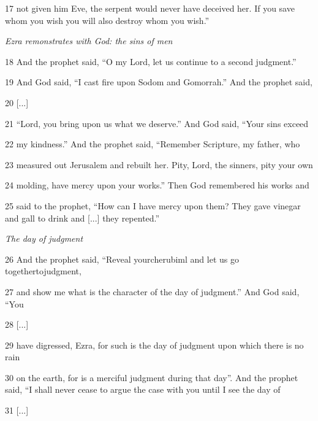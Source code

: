 \par 17 not given him Eve, the serpent would never have deceived her. If you save whom you wish you will also destroy whom you wish.”

\par \textit{Ezra remonstrates with God: the sins of men}

\par 18 And the prophet said, “O my Lord, let us continue to a second judgment.”

\par 19 And God said, “I cast fire upon Sodom and Gomorrah.” And the prophet said,

\par 20 [...]

\par 21 “Lord, you bring upon us what we deserve.” And God said, “Your sins exceed

\par 22 my kindness.” And the prophet said, “Remember Scripture, my father, who

\par 23 measured out Jerusalem and rebuilt her. Pity, Lord, the sinners, pity your own

\par 24 molding, have mercy upon your works.” Then God remembered his works and

\par 25 said to the prophet, “How can I have mercy upon them? They gave vinegar and gall to drink and [...] they repented.”

\par \textit{The day of judgment}

\par 26 And the prophet said, “Reveal yourcherubiml and let us go togethertojudgment,

\par 27 and show me what is the character of the day of judgment.” And God said, “You

\par 28 [...]

\par 29 have digressed, Ezra, for such is the day of judgment upon which there is no rain

\par 30 on the earth, for is a merciful judgment during that day”. And the prophet said, “I shall never cease to argue the case with you until I see the day of

\par 31 [...]

